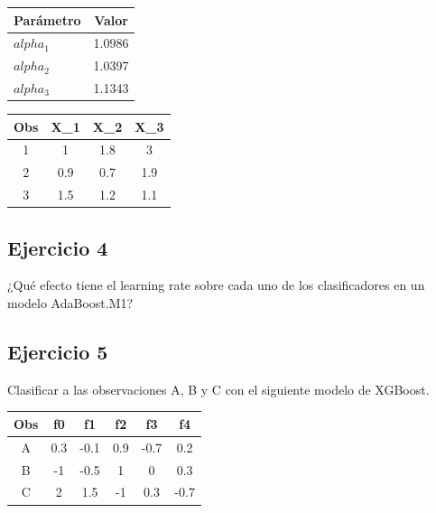 \documentclass[12pt]{article}
\begin{document}
\begin{center}
\begin{tabular}{l c}
    \toprule
    Parámetro & Valor \\
    \midrule
    $alpha_1$ & 1.0986 \\
    $alpha_2$ & 1.0397 \\
    $alpha_3$ & 1.1343 \\
    \bottomrule
\end{tabular}
\end{center}

\begin{center}
\begin{tabular}{|c|c|c|c|}
    \hline
    Obs & X\_1 & X\_2 & X\_3 \\
    \hline
    1 & 1 & 1.8 & 3 \\
    \hline
    2 & 0.9 & 0.7 & 1.9 \\
    \hline
    3 & 1.5 & 1.2 & 1.1 \\
    \hline
\end{tabular}
\end{center}

\subsection{Ejercicio 4}

¿Qué efecto tiene el learning rate sobre cada uno de los clasificadores en un modelo AdaBoost.M1? 

\subsection{Ejercicio 5}


Clasificar a las observaciones A, B y C con el siguiente modelo de XGBoost.

\begin{center}
\begin{tabular}{|c|c|c|c|c|c|}
\hline
Obs & f0 & f1 & f2 & f3 & f4 \\
\hline
A & 0.3 & -0.1 & 0.9 & -0.7 & 0.2 \\
\hline
B & -1 & -0.5 & 1 & 0 & 0.3 \\
\hline
C & 2 & 1.5 & -1 & 0.3 & -0.7 \\
\hline
\end{tabular}
\end{center}
\end{document}
